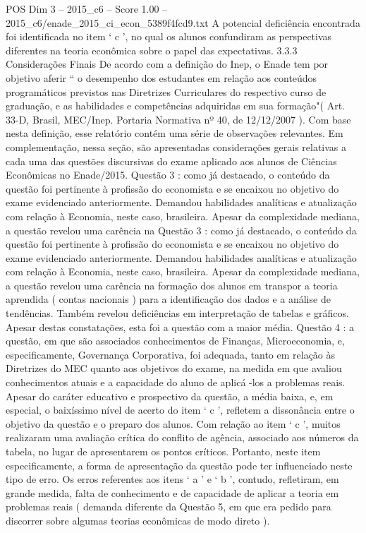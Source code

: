 \begin{textsample}{POS Dim 3 – 2015\_c6 – Score 1.00 – 2015\_c6/enade\_2015\_ci\_econ\_5389f4fcd9.txt}
A potencial deficiência encontrada foi identificada no item ‘ c ’, no qual os alunos confundiram as perspectivas diferentes na teoria econômica sobre o papel das expectativas. 3.3.3 Considerações Finais De acordo com a definição do Inep, o Enade tem por objetivo aferir “ o desempenho dos estudantes em relação aos conteúdos programáticos previstos nas Diretrizes Curriculares do respectivo curso de graduação, e as habilidades e competências adquiridas em sua formação"( Art. 33-D, Brasil, MEC/Inep.
Portaria Normativa nº 40, de 12/12/2007 ).
Com base nesta definição, esse relatório contém uma série de observações relevantes.
Em complementação, nessa seção, são apresentadas considerações gerais relativas a cada uma das questões discursivas do exame aplicado aos alunos de Ciências Econômicas no Enade/2015.
Questão 3 : como já destacado, o conteúdo da questão foi pertinente à profissão do economista e se encaixou no objetivo do exame evidenciado anteriormente.
Demandou habilidades analíticas e atualização com relação à Economia, neste caso, brasileira.
Apesar da complexidade mediana, a questão revelou uma carência na Questão 3 : como já destacado, o conteúdo da questão foi pertinente à profissão do economista e se encaixou no objetivo do exame evidenciado anteriormente.
Demandou habilidades analíticas e atualização com relação à Economia, neste caso, brasileira.
Apesar da complexidade mediana, a questão revelou uma carência na formação dos alunos em transpor a teoria aprendida ( contas nacionais ) para a identificação dos dados e a análise de tendências.
Também revelou deficiências em interpretação de tabelas e gráficos.
Apesar destas constatações, esta foi a questão com a maior média.
Questão 4 : a questão, em que são associados conhecimentos de Finanças, Microeconomia, e, especificamente, Governança Corporativa, foi adequada, tanto em relação às Diretrizes do MEC quanto aos objetivos do exame, na medida em que avaliou conhecimentos atuais e a capacidade do aluno de aplicá -los a problemas reais.
Apesar do caráter educativo e prospectivo da questão, a média baixa, e, em especial, o baixíssimo nível de acerto do item ‘ c ’, refletem a dissonância entre o objetivo da questão e o preparo dos alunos.
Com relação ao item ‘ c ’, muitos realizaram uma avaliação crítica do conflito de agência, associado aos números da tabela, no lugar de apresentarem os pontos críticos.
Portanto, neste item especificamente, a forma de apresentação da questão pode ter influenciado neste tipo de erro.
Os erros referentes aos itens ‘ a ’ e ‘ b ’, contudo, refletiram, em grande medida, falta de conhecimento e de capacidade de aplicar a teoria em problemas reais ( demanda diferente da Questão 5, em que era pedido para discorrer sobre algumas teorias econômicas de modo direto ).

\end{textsample}
